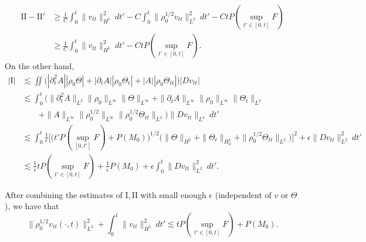 \documentclass[12pt,a4paper]{amsart}
\numberwithin{equation}{section}
\theoremstyle{plain}
\theoremstyle{definition}
\begin{document}
\begin{align*}
\mathrm{II}-\mathrm{II}' &\geq \frac{1}{C}\int_{0}^{t} \|v_{tt}\|_{H^1}^2\ dt'
   -C\int_{0}^{t}\|\rho_0^{1/2} v_{tt}\|_{L^2}^2\ dt'-CtP(\sup\limits_{t'\in[0,t]}F)\\
&\geq \frac{1}{C}\int_{0}^{t} \|v_{tt}\|_{H^1}^2\ dt'-CtP(\sup\limits_{t'\in[0,t]}F).
\end{align*}
On the other hand,
\begin{align*}
|\mathrm{I}|&\lesssim \iint \Big(|\partial_t^2 A| |\rho_0\Theta|
+|\partial_t A| |\rho_0 \Theta_t|+|A| |\rho_0 \Theta_{tt}|\Big) |Dv_{tt}| \\
&\lesssim \int_{0}^{t} \Big(\|\partial_t^2 A\|_{L^2} \|\rho_0\|_{L^{\infty}}\|\Theta\|_{L^{\infty}}
+\|\partial_t A\|_{L^{\infty}} \|\rho_0\|_{L^{\infty}}\|\Theta_t\|_{L^2}\\
&\qquad+\|A\|_{L^{\infty}}\|\rho_0^{1/2}\|_{L^{\infty}}\|\rho_0^{1/2}\Theta_{tt}\|_{L^2}\Big) \|Dv_{tt}\|_{L^2} \ dt'\\
&\lesssim \int_{0}^{t} \frac{1}{\epsilon}\Big[
   \Big( t'P(\sup\limits_{[0,t']}F)+P(M_0)  \Big)^{1/2}
   \Big(\|\Theta\|_{H^2}+\|\Theta_t\|_{H_0^1}+\|\rho_0^{1/2}\Theta_{tt}\|_{L^2}\Big)  \Big]^2+\epsilon \|Dv_{tt}\|_{L^2}^2\ dt'\\
&\lesssim \frac{1}{\epsilon}tP(\sup\limits_{t'\in[0,t]}F)+\frac{1}{\epsilon}P(M_0)+\epsilon \int_{0}^{t} \|Dv_{tt}\|_{L^2}^2\ dt'.
\end{align*}

After combining the estimates of $\mathrm{I}, \mathrm{II}$ with small enough $\epsilon$ (independent of $v$ or $\Theta$), we have that
\begin{equation}\label{vtt}
\|\rho_0^{1/2}v_{tt}(\cdot,t)\|^2_{L^2}+\int_{0}^{t}\|v_{tt}\|_{H^1}^2\ dt'
\lesssim tP(\sup\limits_{t'\in[0,t]}F)+P(M_0).
\end{equation}
\end{document}
